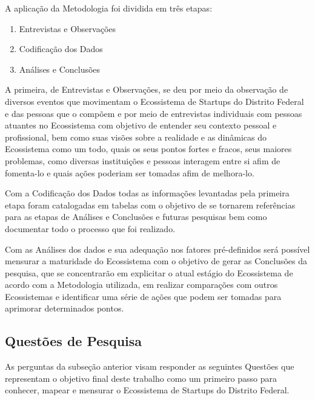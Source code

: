 A aplicação da Metodologia foi dividida em três etapas:

\begin{enumerate}
  \item Entrevistas e Observações
  \item Codificação dos Dados
  \item Análises e Conclusões
\end{enumerate}

A primeira, de Entrevistas e Observações, se deu por meio da observação de diversos eventos que movimentam o Ecossistema de Startups do Distrito Federal e das pessoas que o compõem e por meio de entrevistas individuais com pessoas atuantes no Ecossistema com objetivo de entender seu contexto pessoal e profissional, bem como suas visões sobre a realidade e as dinâmicas do Ecossistema como um todo, quais os seus pontos fortes e fracos, seus maiores problemas, como diversas instituições e pessoas interagem entre si afim de fomenta-lo e quais ações poderiam ser tomadas afim de melhora-lo.

Com a Codificação dos Dados todas as informações levantadas pela primeira etapa foram catalogadas em tabelas com o objetivo de se tornarem referências para as etapas de Análises e Conclusões e futuras pesquisas bem como documentar todo o processo que foi realizado. 

Com as Análises dos dados e sua adequação nos fatores pré-definidos será possível mensurar a maturidade do Ecossistema com o objetivo de gerar as Conclusões da pesquisa, que se concentrarão em explicitar o atual estágio do Ecossistema de acordo com a Metodologia utilizada, em realizar comparações com outros Ecossistemas e identificar uma série de ações que podem ser tomadas para aprimorar determinados pontos.

\subsection{Questões de Pesquisa}
\label{subsection:questoes_de_pesquisa}

As perguntas da subseção anterior visam responder as seguintes Questões que representam o objetivo final deste trabalho como um primeiro passo para conhecer, mapear e mensurar o Ecossistema de Startups do Distrito Federal.

